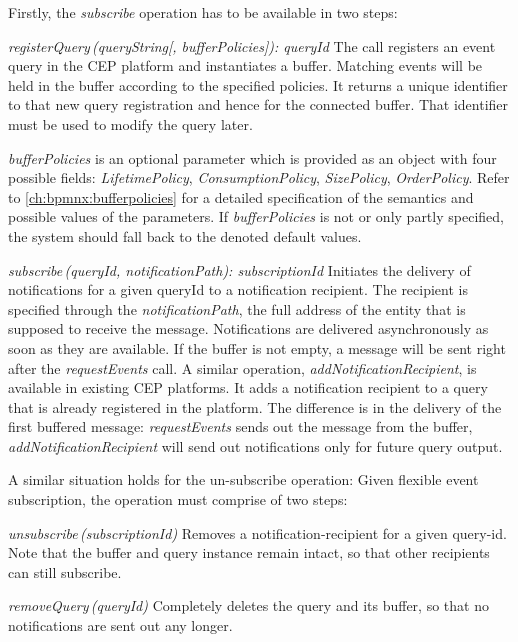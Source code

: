 Firstly, the \textit{subscribe} operation has to be available in two steps:

\begin{aenumerate}
	\item \textit{registerQuery\,(queryString[, bufferPolicies]): queryId}\newline
	The call registers an event query in the CEP platform and instantiates a buffer. Matching events will be held in the buffer according to the specified  policies. It returns a unique identifier to that new query registration and hence for the connected buffer. That identifier must be used to modify the query later.
	
	\textit{bufferPolicies} is an optional parameter which is provided as an object with four possible fields: \textit{LifetimePolicy}, \textit{ConsumptionPolicy}, \textit{SizePolicy}, \textit{OrderPolicy}. Refer to \autoref{ch:bpmnx:bufferpolicies} for a detailed specification of the semantics and possible values of the parameters. If \textit{bufferPolicies} is not or only partly specified, the system should fall back to the denoted default values.
	
	\item \textit{subscribe\,(queryId, notificationPath): subscriptionId}\newline
	Initiates the delivery of notifications for a given queryId to a notification recipient.
	The recipient is specified through the \textit{notificationPath}, the full address of the entity that is supposed to receive the message.
	Notifications are delivered asynchronously as soon as they are available. If the buffer is not empty, a message will be sent right after the \textit{requestEvents} call.
	A similar operation, \textit{addNotificationRecipient}, is available in existing CEP platforms. It adds a notification recipient to a query that is already registered in the platform. The difference is in the delivery of the first buffered message: \textit{requestEvents} sends out the message from the buffer, \textit{addNotificationRecipient} will send out notifications only for future query output.
\end{aenumerate}\label{def:apiextension-subscribe}

\noindent A similar situation holds for the un-subscribe operation: Given flexible event subscription, the operation must comprise of two steps:

\begin{aenumerate}
	\setcounter{enumi}{2}
	\item \textit{unsubscribe\,(subscriptionId)}\newline
	Removes a notification-recipient for a given query-id. Note that the buffer and query instance remain intact, so that other recipients can still subscribe.
	\item \textit{removeQuery\,(queryId)}\newline
	Completely deletes the query and its buffer, so that no notifications are sent out any longer. 
\end{aenumerate}\label{def:apiextension-unsubscribe}

